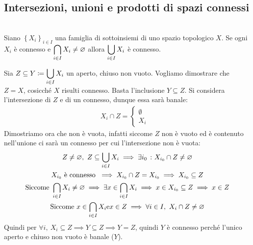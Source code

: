 \subsection{Intersezioni, unioni e prodotti di spazi connessi}
\begin{theorema}~{}\\ \label{unione sottospazi connessi}
	Siano $\left\{ X_i \right\}_{i\in I}$ una famiglia di sottoinsiemi di uno spazio topologico $X$. Se ogni $X_i$ è connesso e $\displaystyle\mathop{{\bigcap}}\displaylimits_{i\in I}X_i\neq\varnothing$ allora $\displaystyle\mathop{{\bigcup}}\displaylimits_{i\in I}X_i$ è connesso.	
\end{theorema}
\begin{demonstration}
	Sia $\displaystyle Z\subseteq Y\coloneqq \mathop{{\bigcup}}\displaylimits_{i\in I}X_i$ un aperto, chiuso non vuoto. Vogliamo dimostrare che $Z=X$, cosicché $X$ risulti connesso. Basta l'inclusione $Y\subseteq Z$.\newline
	Si considera l'intersezione di $Z$ e di un connesso, dunque essa sarà banale:
	\begin{gather*}
		X_i \cap Z = \begin{cases}
			\emptyset & \\
			X_i	&		
		\end{cases}
	\end{gather*}
	Dimostriamo ora che non è vuota, infatti siccome $Z$ non è vuoto ed è contenuto nell'unione ci sarà un connesso per cui l'intersezione non è vuota:
		\begin{gather*}
			Z\neq\varnothing, \ Z\subseteq \mathop{{\bigcup}}\displaylimits_{i\in I}X_i \implies \exists i_0 \ \colon X_{i_0}\cap Z\neq \varnothing	\\
			X_{i_0} \text{ è connesso } \implies X_{i_0}\cap Z=X_{i_0} \implies X_{i_0}\subseteq Z \\
			\text{Siccome } \mathop{{\bigcap}}\displaylimits_{i\in I}X_i\neq\varnothing \implies \exists x\in\mathop{{\bigcap}}\displaylimits_{i\in I}X_i \implies x\in X_{i_0}\subseteq Z \implies x\in Z	\\
			\text{Siccome } x\in\mathop{{\bigcap}}\displaylimits_{i\in I}X_i \text{e} x\in Z \implies \forall i\in I, \ X_i\cap Z\neq\varnothing
		\end{gather*}
	Quindi per $\forall i, \ X_i\subseteq Z \implies Y\subseteq Z \implies Y=Z$, quindi $Y$ è connesso perché l'unico aperto e chiuso non vuoto è banale ($Y$).
\end{demonstration}

